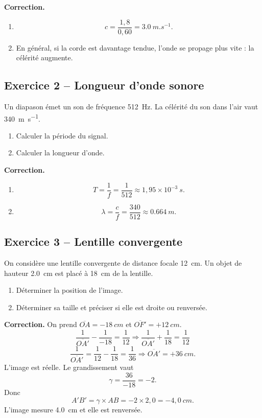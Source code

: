 \documentclass[11pt,a4paper]{article}
\begin{document}
\textbf{Correction.}
\begin{enumerate}[label=\alph*)]
    \item
    \[
    c=\frac{1,8}{0,60}=\SI{3,0}{m.s^{-1}}.
    \]
    \item En général, si la corde est davantage tendue, l'onde se propage plus vite : la célérité augmente.
\end{enumerate}

\subsection*{Exercice 2 -- Longueur d'onde sonore}
Un diapason émet un son de fréquence \SI{512}{Hz}. La célérité du son dans l'air vaut \SI{340}{m.s^{-1}}.
\begin{enumerate}[label=\alph*)]
    \item Calculer la période du signal.
    \item Calculer la longueur d'onde.
\end{enumerate}

\textbf{Correction.}
\begin{enumerate}[label=\alph*)]
    \item
    \[
    T=\frac{1}{f}=\frac{1}{512}\approx 1{,}95\times 10^{-3}\ \si{s}.
    \]
    \item
    \[
    \lambda=\frac{c}{f}=\frac{340}{512}\approx \SI{0,664}{m}.
    \]
\end{enumerate}

\subsection*{Exercice 3 -- Lentille convergente}
On considère une lentille convergente de distance focale \SI{12}{cm}. Un objet de hauteur \SI{2,0}{cm} est placé à \SI{18}{cm} de la lentille.
\begin{enumerate}[label=\alph*)]
    \item Déterminer la position de l'image.
    \item Déterminer sa taille et préciser si elle est droite ou renversée.
\end{enumerate}

\textbf{Correction.}
On prend \(\overline{OA}=-18\ \si{cm}\) et \(\overline{OF'}=+12\ \si{cm}\).
\[
\frac{1}{\overline{OA'}}-\frac{1}{-18}=\frac{1}{12}
\Rightarrow \frac{1}{\overline{OA'}}+\frac{1}{18}=\frac{1}{12}
\]
\[
\frac{1}{\overline{OA'}}=\frac{1}{12}-\frac{1}{18}=\frac{1}{36}
\Rightarrow \overline{OA'}=+36\ \si{cm}.
\]
L'image est réelle. Le grandissement vaut
\[
\gamma=\frac{36}{-18}=-2.
\]
Donc
\[
A'B'=\gamma\times AB=-2\times 2{,}0=-4{,}0\ \si{cm}.
\]
L'image mesure \SI{4,0}{cm} et elle est renversée.
\end{document}
